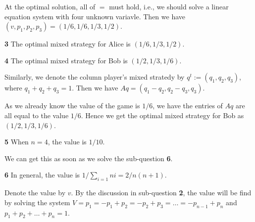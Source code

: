 \documentclass[10pt]{article}
\begin{document}
At the optimal solution, all of $=$ must hold,
i.e., we should solve a linear equation system with four unknown variavle. 
Then we have $(v,p_1,p_2,p_3) = (1/6,1/6,1/3,1/2)$.

\noindent\textbf{3}
The optimal mixed strategy for Alice is $(1/6,1/3,1/2)$.

\noindent\textbf{4}
The optimal mixed strategy for Bob is $(1/2,1/3,1/6)$.

Similarly, we denote the column player's mixed stratedy by $q^t:=(q_1,q_2,q_3)$,
where $q_1+q_2+q_3=1$.
Then we have $Aq = (q_1-q_2,q_2-q_3,q_3)$.

As we already know the value of the game is $1/6$, 
we have the entries of $Aq$ are all equal to the value $1/6$.
Hence we get the optimal mixed strategy for Bob as $(1/2,1/3,1/6)$.

\noindent\textbf{5}
When $n=4$, the value is $1/10$.

We can get this as soon as we solve the sub-question \textbf{6}.

\noindent\textbf{6}
In general, the value is $1/\sum_{i=1}{n}i=2/n(n+1)$.

Denote the value by $v$. 
By the discussion in sub-question \textbf{2},
the value will be find by solving the system
$V=p_1=-p_1+p_2=-p_2+p_3=\dots=-p_{n-1}+p_n$ and $p_1+p_2+\dots+p_n=1$.
\end{document}
